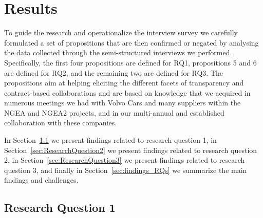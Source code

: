\section{Results}\label{sec:results}

To guide the research and operationalize the interview survey %
we carefully formulated a set of propositions that are then confirmed or negated by analysing the data collected through the semi-structured interviews we performed. Specifically, the first four propositions are defined for RQ1, propositions  5 and 6 are defined for RQ2,  and the remaining two are defined for RQ3.
The propositions aim at helping eliciting the different facets of transparency and contract-based collaborations and are based on knowledge that we acquired in numerous meetings we had with Volvo Cars and many suppliers within the NGEA and NGEA2 projects, and in our multi-annual and established collaboration with these companies. %



In Section~\ref{sec:ResearchQuestion1} we present findings related to research question 1, in Section~\ref{sec:ResearchQuestion2} we present findings related to research question 2,  in Section~\ref{sec:ResearchQuestion3} we present findings related to research question 3, and finally
 in Section~\ref{sec:findings_RQs} we summarize the main findings and challenges.

\subsection{Research Question 1}\label{sec:ResearchQuestion1}

